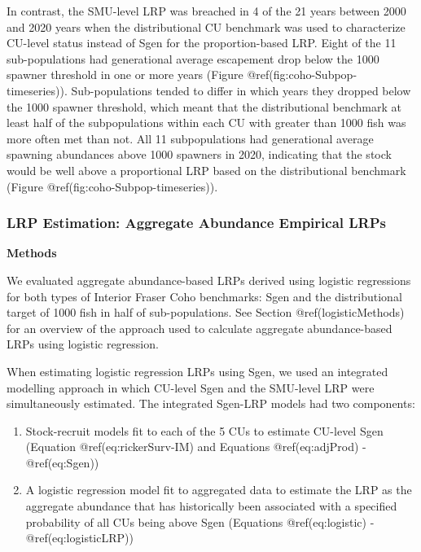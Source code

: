 \documentclass[
]{article}
\begin{document}
In contrast, the SMU-level LRP was breached in 4 of the 21 years between
2000 and 2020 years when the distributional CU benchmark was used to
characterize CU-level status instead of Sgen for the proportion-based
LRP. Eight of the 11 sub-populations had generational average escapement
drop below the 1000 spawner threshold in one or more years (Figure
@ref(fig:coho-Subpop-timeseries)). Sub-populations tended to differ in
which years they dropped below the 1000 spawner threshold, which meant
that the distributional benchmark at least half of the subpopulations
within each CU with greater than 1000 fish was more often met than not.
All 11 subpopulations had generational average spawning abundances above
1000 spawners in 2020, indicating that the stock would be well above a
proportional LRP based on the distributional benchmark (Figure
@ref(fig:coho-Subpop-timeseries)).

\hypertarget{lrp-estimation-aggregate-abundance-empirical-lrps}{%
\subsubsection{LRP Estimation: Aggregate Abundance Empirical
LRPs}\label{lrp-estimation-aggregate-abundance-empirical-lrps}}

\textbf{Methods}

We evaluated aggregate abundance-based LRPs derived using logistic
regressions for both types of Interior Fraser Coho benchmarks: Sgen and
the distributional target of 1000 fish in half of sub-populations. See
Section @ref(logisticMethods) for an overview of the approach used to
calculate aggregate abundance-based LRPs using logistic regression.

When estimating logistic regression LRPs using Sgen, we used an
integrated modelling approach in which CU-level Sgen and the SMU-level
LRP were simultaneously estimated. The integrated Sgen-LRP models had
two components:

\begin{enumerate}
\def\labelenumi{(\roman{enumi})}
\item
  Stock-recruit models fit to each of the 5 CUs to estimate CU-level
  Sgen (Equation @ref(eq:rickerSurv-IM) and Equations @ref(eq:adjProd) -
  @ref(eq:Sgen))
\item
  A logistic regression model fit to aggregated data to estimate the LRP
  as the aggregate abundance that has historically been associated with
  a specified probability of all CUs being above Sgen (Equations
  @ref(eq:logistic) - @ref(eq:logisticLRP))
\end{enumerate}
\end{document}
